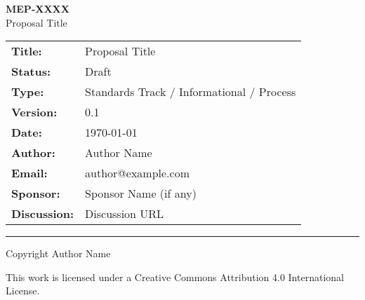 \documentclass[11pt]{article}
\makeatletter
\newcommand{\proposalType}{MEP}
\newcommand{\proposalNumber}{XXXX}
\newcommand{\proposalTitle}{Proposal Title}
\newcommand{\proposalStatus}{Draft}
\newcommand{\proposalVersion}{0.1}
\newcommand{\proposalDate}{\today}
\newcommand{\proposalAuthor}{Author Name}
\newcommand{\proposalAuthorsEmail}{author@example.com}
\newcommand{\proposalSponsor}{Sponsor Name (if any)}
\newcommand{\proposalDiscussion}{Discussion URL}
\makeatother
\begin{document}
	
	\begin{titlepage}
		\centering
		
		\vspace*{2cm}
		
		{\Huge\bfseries \proposalType-\proposalNumber\\}
		\vspace{0.5cm}
		{\LARGE \proposalTitle}
		
		\vspace{2cm}
		
		\begin{tabular}{ll}
			\textbf{Title:} & \proposalTitle \\
			\textbf{Status:} & \proposalStatus \\
			\textbf{Type:} & Standards Track / Informational / Process \\
			\textbf{Version:} & \proposalVersion \\
			\textbf{Date:} & \proposalDate \\
			\textbf{Author:} & \proposalAuthor \\
			\textbf{Email:} & \proposalAuthorsEmail \\
			\textbf{Sponsor:} & \proposalSponsor \\
			\textbf{Discussion:} & \proposalDiscussion \\
		\end{tabular}
		
		\vfill
		
		\begin{abstract}
			This enhancement proposal describes [brief summary of what the proposal does and why it's important]. 
			It addresses [key problem or opportunity] by [main approach]. 
			The proposed changes will [expected benefits or outcomes]. 
			This proposal is relevant for [target audience or components affected].
		\end{abstract}
		
		\vspace{1cm}
		
		\rule{\textwidth}{0.4pt}
		
		\vspace{0.5cm}
		
		\small
		Copyright \textcopyright{} \the\year{} \proposalAuthor
		
		This work is licensed under a Creative Commons Attribution 4.0 International License.
		
	\end{titlepage}
	
	\tableofcontents
	\newpage
	
\end{document}
